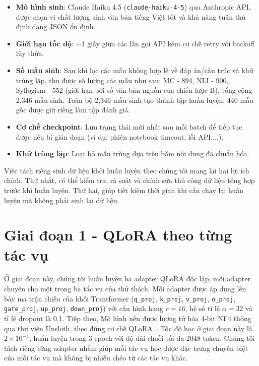 \begin{itemize}
    \item \textbf{Mô hình sinh}: Claude Haiku 4.5 (\texttt{claude-haiku-4-5}) qua Anthropic API, được chọn vì chất lượng sinh văn bản tiếng Việt tốt và khả năng tuân thủ định dạng JSON ổn định.
    \item \textbf{Giới hạn tốc độ}: $\sim$1 giây giữa các lần gọi API kèm cơ chế retry với backoff lũy thừa.
    \item \textbf{Số mẫu sinh}: Sau khi lọc các mẫu không hợp lệ về đáp án/cấu trúc và khử trùng lặp, thu được số lượng các mẫu như sau: MC - 894, NLI - 900, Syllogism - 552 (giới hạn bởi số văn bản nguồn của chiến lược B), tổng cộng 2,346 mẫu sinh. Toàn bộ 2,346 mẫu sinh tạo thành tập huấn luyện; 440 mẫu gốc được giữ riêng làm tập đánh giá.
    \item \textbf{Cơ chế checkpoint}: Lưu trạng thái mới nhất sau mỗi batch để tiếp tục được nếu bị gián đoạn (ví dụ: phiên notebook timeout, lỗi API,...).
    \item \textbf{Khử trùng lặp}: Loại bỏ mẫu trùng dựa trên băm nội dung đã chuẩn hóa.
\end{itemize}

Việc tách riêng sinh dữ liệu khỏi huấn luyện theo chúng tôi mang lại hai lợi ích chính. Thứ nhất, có thể kiểm tra, rà soát và chỉnh sửa thủ công dữ liệu tổng hợp trước khi huấn luyện. Thứ hai, giúp tiết kiệm thời gian khi cần chạy lại huấn luyện mà không phải sinh lại dữ liệu.

\section{Giai đoạn 1 - QLoRA theo từng tác vụ}

Ở giai đoạn này, chúng tôi huấn luyện ba adapter QLoRA độc lập, mỗi adapter chuyên cho một trong ba tác vụ của thử thách. Mỗi adapter được áp dụng lên bảy ma trận chiếu của khối Transformer (\texttt{q\_proj}, \texttt{k\_proj}, \texttt{v\_proj}, \texttt{o\_proj}, \texttt{gate\_proj}, \texttt{up\_proj}, \texttt{down\_proj}) với cấu hình hạng $r=16$, hệ số tỉ lệ $\alpha=32$ và tỉ lệ dropout là 0.1. Tiếp theo, Mô hình nền được lượng tử hóa 4-bit NF4 thông qua thư viện Unsloth, theo đúng cơ chế QLoRA~\cite{dettmers2023qlora}. Tốc độ học ở giai đoạn này là $2 \times 10^{-4}$, huấn luyện trong 3 epoch với độ dài chuỗi tối đa 2048 token. Chúng tôi tách riêng từng adapter nhằm giúp mỗi tác vụ học được đặc trưng chuyên biệt của mỗi tác vụ mà không bị nhiễu chéo từ các tác vụ khác.

